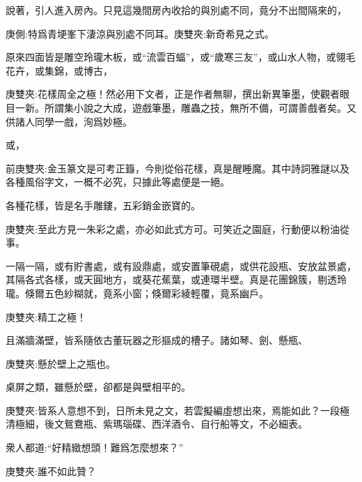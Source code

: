 \begin{parag}
    說著，引人進入房內。只見這幾間房內收拾的與別處不同，竟分不出間隔來的，\begin{note}庚側:特爲青埂峯下淒涼與別處不同耳。庚雙夾:新奇希見之式。\end{note}原來四面皆是雕空玲瓏木板，或“流雲百蝠”，或“歲寒三友”，或山水人物，或翎毛花卉，或集錦，或博古，\begin{note}庚雙夾:花樣周全之極！然必用下文者，正是作者無聊，撰出新異筆墨，使觀者眼目一新。所謂集小說之大成，遊戲筆墨，雕蟲之技，無所不備，可謂善戲者矣。又供諸人同學一戲，洵爲妙極。\end{note}或，\begin{note}前庚雙夾:金玉篆文是可考正籙，今則從俗花樣，真是醒睡魔。其中詩詞雅謎以及各種風俗字文，一概不必究，只據此等處便是一絕。\end{note}各種花樣，皆是名手雕鏤，五彩銷金嵌寶的。\begin{note}庚雙夾:至此方見一朱彩之處，亦必如此式方可。可笑近之園庭，行動便以粉油從事。\end{note}一隔一隔，或有貯書處，或有設鼎處，或安置筆硯處，或供花設瓶、安放盆景處，其隔各式各樣，或天圓地方，或葵花蕉葉，或連環半壁。真是花團錦簇，剔透玲瓏。倏爾五色紗糊就，竟系小窗；倏爾彩綾輕覆，竟系幽戶。\begin{note}庚雙夾:精工之極！\end{note}且滿牆滿壁，皆系隨依古董玩器之形摳成的槽子。諸如琴、劍、懸瓶、\begin{note}庚雙夾:懸於壁上之瓶也。\end{note}桌屏之類，雖懸於壁，卻都是與壁相平的。\begin{note}庚雙夾:皆系人意想不到，日所未見之文，若雲擬編虛想出來，焉能如此？一段極清極細，後文鴛鴦瓶、紫瑪瑙碟、西洋酒令、自行船等文，不必細表。\end{note}衆人都道:“好精緻想頭！難爲怎麼想來？”\begin{note}庚雙夾:誰不如此贊？\end{note}
\end{parag}


